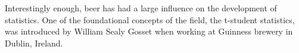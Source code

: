 

\label{chp:power series}


Interestingly enough, beer has had a large influence on the development of
statistics.
One of the foundational concepts of the field, the t-student statistics,
was introduced by William Sealy Gosset when working at Guinness brewery in
Dublin, Ireland.


\begin{refsection}
\printbibliography[heading=subbibliography]
\end{refsection}

